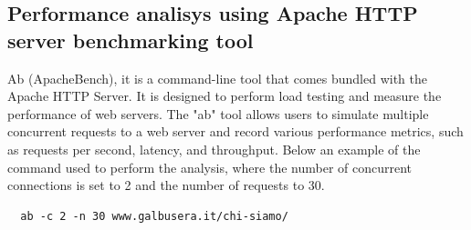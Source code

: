 \documentclass[eng]{class}
\begin{document}
\subsection{Performance analisys using  Apache HTTP server benchmarking tool}
Ab (ApacheBench), it is a command-line tool that comes bundled with the Apache HTTP Server.
It is designed to perform load testing and measure the performance of web servers.
The "ab" tool allows users to simulate multiple concurrent requests to a web server and record various performance metrics,
such as requests per second, latency, and throughput.
Below an example of the command used to perform the analysis, where the number of concurrent connections is set to 2 and the number of requests to 30.
\begin{lstlisting}
  ab -c 2 -n 30 www.galbusera.it/chi-siamo/
\end{lstlisting}
\end{document}
